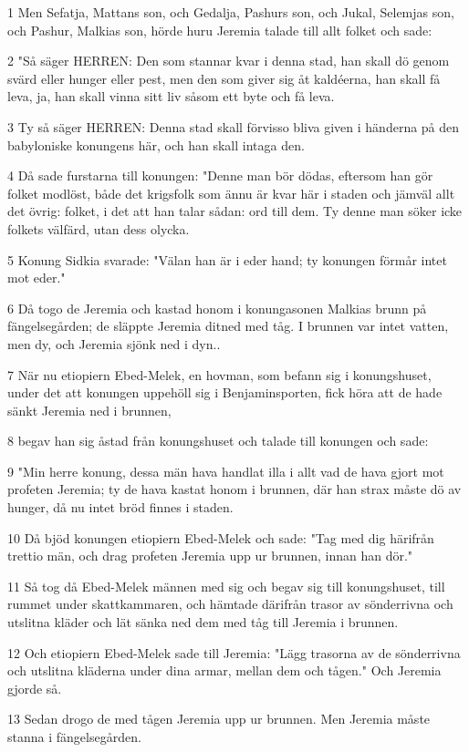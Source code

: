 \par 1 Men Sefatja, Mattans son, och Gedalja, Pashurs son, och Jukal, Selemjas son, och Pashur, Malkias son, hörde huru Jeremia talade till allt folket och sade:
\par 2 "Så säger HERREN: Den som stannar kvar i denna stad, han skall dö genom svärd eller hunger eller pest, men den som giver sig åt kaldéerna, han skall få leva, ja, han skall vinna sitt liv såsom ett byte och få leva.
\par 3 Ty så säger HERREN: Denna stad skall förvisso bliva given i händerna på den babyloniske konungens här, och han skall intaga den.
\par 4 Då sade furstarna till konungen: "Denne man bör dödas, eftersom han gör folket modlöst, både det krigsfolk som ännu är kvar här i staden och jämväl allt det övrig: folket, i det att han talar sådan: ord till dem. Ty denne man söker icke folkets välfärd, utan dess olycka.
\par 5 Konung Sidkia svarade: "Välan han är i eder hand; ty konungen förmår intet mot eder."
\par 6 Då togo de Jeremia och kastad honom i konungasonen Malkias brunn på fängelsegården; de släppte Jeremia ditned med tåg. I brunnen var intet vatten, men dy, och Jeremia sjönk ned i dyn..
\par 7 När nu etiopiern Ebed-Melek, en hovman, som befann sig i konungshuset, under det att konungen uppehöll sig i Benjaminsporten, fick höra att de hade sänkt Jeremia ned i brunnen,
\par 8 begav han sig åstad från konungshuset och talade till konungen och sade:
\par 9 "Min herre konung, dessa män hava handlat illa i allt vad de hava gjort mot profeten Jeremia; ty de hava kastat honom i brunnen, där han strax måste dö av hunger, då nu intet bröd finnes i staden.
\par 10 Då bjöd konungen etiopiern Ebed-Melek och sade: "Tag med dig härifrån trettio män, och drag profeten Jeremia upp ur brunnen, innan han dör."
\par 11 Så tog då Ebed-Melek männen med sig och begav sig till konungshuset, till rummet under skattkammaren, och hämtade därifrån trasor av sönderrivna och utslitna kläder och lät sänka ned dem med tåg till Jeremia i brunnen.
\par 12 Och etiopiern Ebed-Melek sade till Jeremia: "Lägg trasorna av de sönderrivna och utslitna kläderna under dina armar, mellan dem och tågen." Och Jeremia gjorde så.
\par 13 Sedan drogo de med tågen Jeremia upp ur brunnen. Men Jeremia måste stanna i fängelsegården.
